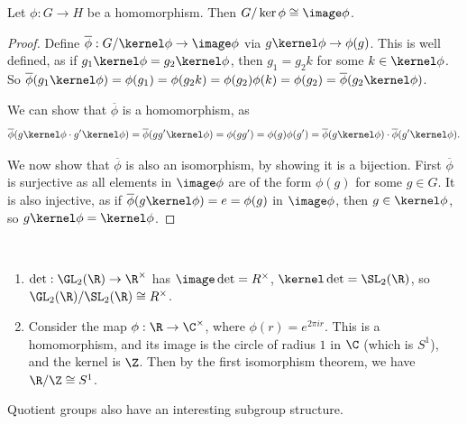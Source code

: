 \documentclass[a4]{scrreprt}
\begin{document}
\begin{theorem}
	Let $\phi : G \rightarrow H$ be a homomorphism. Then $G/\ker \phi \cong \image \phi$.
\end{theorem}
\begin{proof}
	Define $\overline{\phi} : G/\kernel \phi \rightarrow \image \phi$ via $g \kernel \phi \rightarrow \phi(g)$.
	This is well defined, as if $g_1 \kernel \phi = g_2 \kernel \phi$, then $g_1 = g_2k$ for some $k \in \kernel \phi$. So $\overline{\phi}(g_1 \kernel \phi) = \phi(g_1) = \phi(g_2 k) = \phi(g_2) \phi(k) = \phi(g_2) = \overline{\phi}(g_2 \kernel \phi)$.

	We can show that $\overline{\phi}$ is a homomorphism, as 
	$$
	\overline{\phi}(g \kernel \phi \cdot g' \kernel \phi) = \overline{\phi}(g g' \kernel \phi) = \phi(g g') = \phi(g) \phi(g') = \overline{\phi}(g \kernel \phi) \cdot \overline{\phi}(g' \kernel \phi).
	$$

	We now show that $\overline{\phi}$ is also an isomorphism, by showing it is a bijection. First $\overline{\phi}$ is surjective as all elements in $\image \phi$ are of the form $\phi(g)$ for some $g \in G$. It is also injective, as if $\overline{\phi}(g \kernel \phi) = e = \phi(g)$ in $\image \phi$, then $g \in \kernel \phi$, so $g \kernel \phi = \kernel \phi$.
\end{proof}

\begin{example}~
    \vspace*{-1.5\baselineskip}
\begin{enumerate}[label=(\roman*)]
    \item $\det : \GL_2(\R) \rightarrow \R^\times$ has $\image \det = R^\times$, $\kernel \det = \SL_2(\R)$, so $\GL_2(\R) / \SL_2(\R) \cong R^\times$.
    \item Consider the map $\phi : \R \rightarrow \C^\times$, where $\phi(r) = e^{2 \pi i r}$. This is a homomorphism, and its image is the circle of radius $1$ in $\C$ (which is $S^1$), and the kernel is $\Z$. Then by the first isomorphism theorem, we have $\R/\Z \cong S^1$.
\end{enumerate}
\end{example}

Quotient groups also have an interesting subgroup structure.
\end{document}
